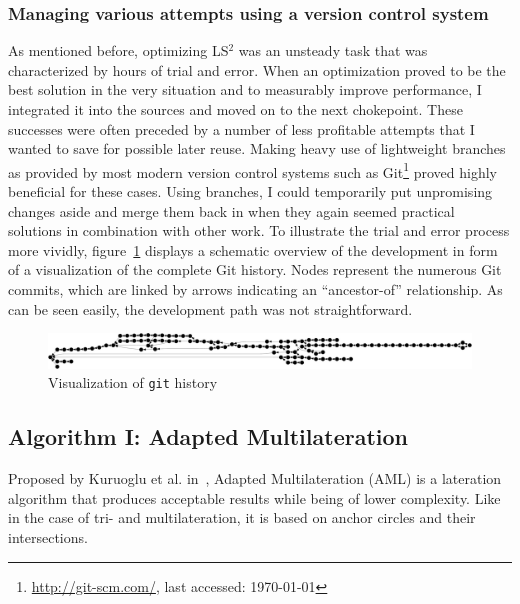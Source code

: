 \subsubsection{Managing various attempts using a version control system}
As mentioned before, optimizing LS$^{2}$ was an unsteady task that was characterized by hours of trial and error. When an optimization proved to be the best solution in the very situation and to measurably improve performance, I integrated it into the sources and moved on to the next chokepoint. These successes were often preceded by a number of less profitable attempts that I wanted to save for possible later reuse. Making heavy use of lightweight branches as provided by most modern version control systems such as Git\footnote{\url{http://git-scm.com/}, last accessed: \today{}} proved highly beneficial for these cases. Using branches, I could temporarily put unpromising changes aside and merge them back in when they again seemed practical solutions in combination with other work. To illustrate the trial and error process more vividly, figure~\ref{fig:branchtree} displays a schematic overview of the development in form of a visualization of the complete Git history. Nodes represent the numerous Git commits, which are linked by arrows indicating an ``ancestor-of'' relationship. As can be seen easily, the development path was not straightforward.

\begin{figure}[h]
\begin{center}
\includegraphics[width=14cm]{img/branchtree}
\end{center}
\caption{Visualization of \texttt{git} history}
\label{fig:branchtree}
\end{figure}

\subsection{Algorithm I: Adapted Multilateration}
Proposed by Kuruoglu et al. in~\cite{kuruoglu2009aml}, Adapted Multilateration (AML) is a lateration algorithm that produces acceptable results while being of lower complexity. Like in the case of tri- and multilateration, it is based on anchor circles and their intersections.

